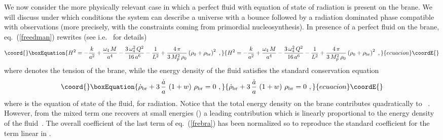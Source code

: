 \documentclass[a4paper,11pt]{article}
\begin{document}
We now consider the more physically relevant case in which a perfect fluid
with equation of state of radiation is present on the brane. We will
discuss under which conditions the system can describe a universe with a
bounce followed by a radiation dominated phase compatible with
observations (more precisely, with the constraints coming from primordial
nucleosynthesis). In presence of a perfect fluid on the brane,
eq.~(\ref{freedman}) rewrites (see i.e.~\cite{MV} for details)
%
\begin{equation}\coord{}\boxEquation{
H^2 = - \frac{k}{a^2} + \frac{\omega_4 \, M}{a^4} - \frac{3\,\omega_4^2\,Q^2}{16\,a^6} - \frac{1}{L^2} + \frac{4 \, \pi}{3 \, M_p^2 \, \rho_0} \left( \rho_0 + \rho_{\rm br} \right)^2 \,\,,
\label{frebra}
}{
H^2 = - \frac{k}{a^2} + \frac{\omega_4 \, M}{a^4} - \frac{3\,\omega_4^2\,Q^2}{16\,a^6} - \frac{1}{L^2} + \frac{4 \, \pi}{3 \, M_p^2 \, \rho_0} \left( \rho_0 + \rho_{\rm br} \right)^2 \,\,,
}{ecuacion}\coordE{}\end{equation}
%
where \coordHE{} denotes the tension of the brane, while the energy density \coordHE{} of the fluid satisfies the standard conservation equation
%
\begin{equation}\coord{}\boxEquation{
\dot{\rho}_{\rm br} + 3 \, \frac{\dot{a}}{a} \, \left( 1 + w \right) \, \rho_{\rm br} = 0 \,\,,
}{
\dot{\rho}_{\rm br} + 3 \, \frac{\dot{a}}{a} \, \left( 1 + w \right) \, \rho_{\rm br} = 0 \,\,,
}{ecuacion}\coordE{}\end{equation}
%
where \coordHE{} is the equation of state of the fluid, \coordHE{} for radiation. 
Notice that the total energy density on the brane \coordHE{}
contributes quadratically to \coordHE{}~\cite{BDL}. However, from the mixed
term \coordHE{} one recovers at small energies
(\coordHE{}) a leading contribution which is linearly
proportional to the energy density of the fluid~\cite{CGKT,CGS}. The
overall coefficient of the last term of eq.~(\ref{frebra}) has been
normalized so to reproduce the standard coefficient for the term linear in
\coordHE{}.
\end{document}
